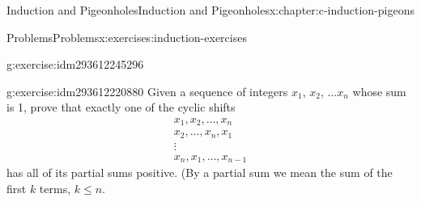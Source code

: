 \documentclass[twoside,10pt,]{book}
\numberwithin{equation}{section}
\begin{document}
\begin{chapterptx}{Induction and Pigeonholes}{}{Induction and Pigeonholes}{}{}{x:chapter:c-induction-pigeons}
\begin{exercises-section}{Problems}{}{Problems}{}{}{x:exercises:induction-exercises}
\begin{divisionexercise}{14}{}{}{g:exercise:idm293612245296}
\end{divisionexercise}%
\begin{divisionexercise}{15}{}{}{g:exercise:idm293612220880}%
Given a sequence of integers \(x_1\), \(x_2\), \(\dots x_n\) whose sum is 1, prove that exactly one of the cyclic shifts%
\begin{gather*}
x_1,x_2,\dots ,x_n \\
x_2,\dots,x_n,x_1  \\
\vdots    \\
x_n,x_1,\dots,x_{n-1}  
\end{gather*}
has all of its partial sums positive. (By a partial sum we mean the sum of the first \(k\) terms, \(k \leq  n\).%
\end{divisionexercise}%
\end{exercises-section}
\end{chapterptx}
%
%
\typeout{************************************************}
\typeout{************************************************}
%
\end{document}
